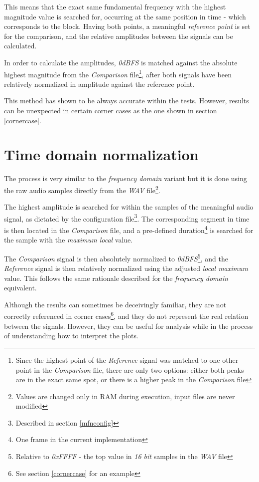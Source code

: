 \documentclass[10pt,a4paper]{report}
\begin{document}
\begin{appendices}
This means that the exact same fundamental frequency with the highest magnitude value is searched for, occurring at the same position in time - which corresponds to the block. Having both points, a meaningful \textit{reference point} is set for the comparison, and the relative amplitudes between the signals can be calculated.

In order to calculate the amplitudes, \textit{0dBFS} is matched against the absolute highest magnitude from the \textit{Comparison} file\footnote{Since the highest point of the \textit{Reference} signal was matched to one other point in the \textit{Comparison} file, there are only two options: either both peaks are in the exact same spot, or there is a higher peak in the \textit{Comparison} file}, after both signals have been relatively normalized in amplitude against the reference point.

This method has shown to be always accurate within the tests. However, results can be unexpected in certain corner cases as the one shown in section \ref{cornercase}. 

\section{Time domain normalization}

The process is very similar to the \textit{frequency domain} variant but it is done using the raw audio samples directly from the \textit{WAV} file\footnote{Values are changed only in RAM during execution, input files are never modified}.

The highest amplitude is searched for within the samples of the meaningful audio signal, as dictated by the configuration file\footnote{Described in section \ref{mfnconfig}}. The corresponding segment in time is then located in the \textit{Comparison} file, and a pre-defined duration\footnote{One frame in the current implementation} is searched for the sample with the \textit{maximum local} value.

The \textit{Comparison} signal is then absolutely normalized to \textit{0dBFS}\footnote{Relative to \textit{0xFFFF} - the top value in \textit{16 bit} samples in the \textit{WAV} file}, and the \textit{Reference} signal is then relatively normalized using the adjusted \textit{local maximum} value. This follows the same rationale described for the \textit{frequency domain} equivalent.

Although the results can sometimes be deceivingly familiar, they are not correctly referenced in corner cases\footnote{See section \ref{cornercase} for an example}, and they do not represent the real relation between the signals. However, they can be useful for analysis while in the process of understanding how to interpret the plots.


\end{appendices}
\end{document}
